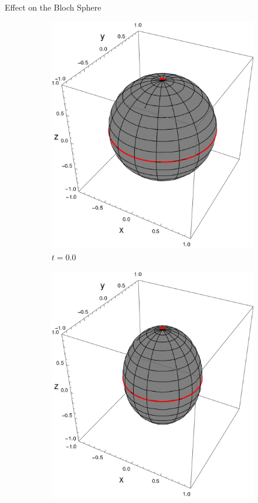 \begin{frame}{Effect on the Bloch Sphere}
    \begin{figure}[h!]
        \centering
        \begin{subfigure}{0.32\textwidth}
            \centering
            \includegraphics[width=0.9\linewidth]{figures/U1xU2_H1=Pi(sz)_H2=Id_z=0.9_p=0.6t=0.png}
            \caption{$t=0.0$}
        \end{subfigure}%
        \begin{subfigure}{0.32\textwidth}
            \centering
            \includegraphics[width=0.9\linewidth]{figures/U1xU2_H1=Pi(sz)_H2=Id_z=0.9_p=0.6t=0.25.png}

\end{subfigure}
\end{figure}
\end{frame}
